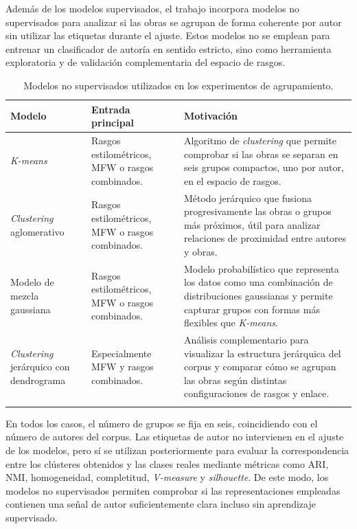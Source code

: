 \documentclass[IB]{TFUOC}%
\begin{document}
Además de los modelos supervisados, el trabajo incorpora modelos no supervisados para analizar si las obras se agrupan de forma coherente por autor sin utilizar las etiquetas durante el ajuste. Estos modelos no se emplean para entrenar un clasificador de autoría en sentido estricto, sino como herramienta exploratoria y de validación complementaria del espacio de rasgos.

\begin{longtable}{|p{4cm}|p{4.6cm}|p{6.3cm}|}
\hline
\textbf{Modelo} & \textbf{Entrada principal} & \textbf{Motivación} \\
\hline

\textit{K-means} &
Rasgos estilométricos, MFW o rasgos combinados. &
Algoritmo de \textit{clustering} que permite comprobar si las obras se separan en seis grupos compactos, uno por autor, en el espacio de rasgos. \\
\hline

\textit{Clustering} aglomerativo &
Rasgos estilométricos, MFW o rasgos combinados. &
Método jerárquico que fusiona progresivamente las obras o grupos más próximos, útil para analizar relaciones de proximidad entre autores y obras. \\
\hline

Modelo de mezcla gaussiana &
Rasgos estilométricos, MFW o rasgos combinados. &
Modelo probabilístico que representa los datos como una combinación de distribuciones gaussianas y permite capturar grupos con formas más flexibles que \textit{K-means}. \\
\hline

\textit{Clustering} jerárquico con dendrograma &
Especialmente MFW y rasgos combinados. &
Análisis complementario para visualizar la estructura jerárquica del corpus y comparar cómo se agrupan las obras según distintas configuraciones de rasgos y enlace. \\
\hline

\caption{Modelos no supervisados utilizados en los experimentos de agrupamiento.}
\label{tab:modelos-no-supervisados}
\end{longtable}

En todos los casos, el número de grupos se fija en seis, coincidiendo con el número de autores del corpus. Las etiquetas de autor no intervienen en el ajuste de los modelos, pero sí se utilizan posteriormente para evaluar la correspondencia entre los clústeres obtenidos y las clases reales mediante métricas como ARI, NMI, homogeneidad, completitud, \textit{V-measure} y \textit{silhouette}. De este modo, los modelos no supervisados permiten comprobar si las representaciones empleadas contienen una señal de autor suficientemente clara incluso sin aprendizaje supervisado.
\end{document}
